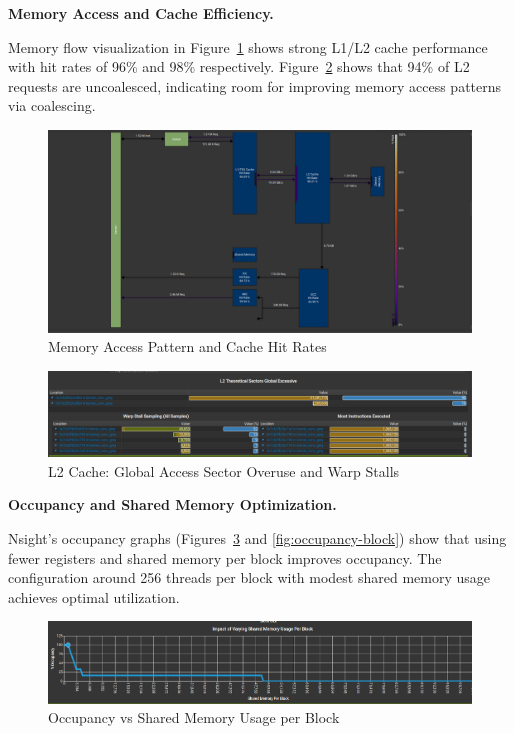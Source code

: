 \documentclass[conference, 10pt]{IEEEtran}
\begin{document}
\textbf{Memory Access and Cache Efficiency.}

Memory flow visualization in Figure~\ref{fig:memory-chart} shows strong L1/L2 cache performance with hit rates of 96\% and 98\% respectively.  
Figure~\ref{fig:l2-excess} shows that 94\% of L2 requests are uncoalesced, indicating room for improving memory access patterns via coalescing.

\begin{figure}[H]
    \centering
    \includegraphics[width=0.9\linewidth]{figures/MemoryChart.png}
    \caption{Memory Access Pattern and Cache Hit Rates}
    \label{fig:memory-chart}
\end{figure}

\begin{figure}[H]
    \centering
    \includegraphics[width=0.9\linewidth]{figures/L2.png}
    \caption{L2 Cache: Global Access Sector Overuse and Warp Stalls}
    \label{fig:l2-excess}
\end{figure}

\textbf{Occupancy and Shared Memory Optimization.}

Nsight’s occupancy graphs (Figures~\ref{fig:occupancy-shared} and \ref{fig:occupancy-block}) show that using fewer registers and shared memory per block improves occupancy. The configuration around 256 threads per block with modest shared memory usage achieves optimal utilization.

\begin{figure}[H]
    \centering
    \includegraphics[width=0.9\linewidth]{figures/ImpactOfVarying_2.png}
    \caption{Occupancy vs Shared Memory Usage per Block}
    \label{fig:occupancy-shared}
\end{figure}
\end{document}
